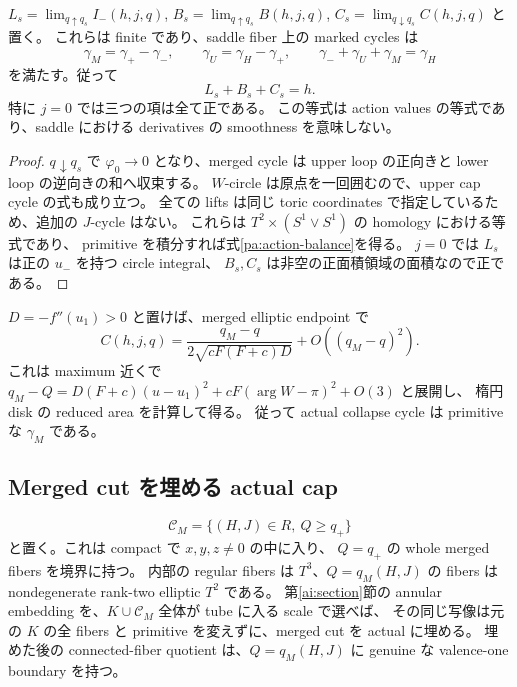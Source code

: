 \begin{proposition}\label{pa:saddle-balance}
$L_s=\lim_{q\uparrow q_s}I_-(h,j,q)$,
$B_s=\lim_{q\uparrow q_s}B(h,j,q)$,
$C_s=\lim_{q\downarrow q_s}C(h,j,q)$ と置く。
これらは finite であり、saddle fiber 上の marked cycles は
\begin{equation}\label{pa:cycle-balance}
 \gamma_M=\gamma_+-\gamma_-,\qquad
 \gamma_U=\gamma_H-\gamma_+,
 \qquad \gamma_-+\gamma_U+\gamma_M=\gamma_H
\end{equation}
を満たす。従って
\begin{equation}\label{pa:action-balance}
 L_s+B_s+C_s=h.
\end{equation}
特に $j=0$ では三つの項は全て正である。
この等式は action values の等式であり、saddle における derivatives の smoothness を意味しない。
\end{proposition}

\begin{proof}
$q\downarrow q_s$ で $\varphi_0\to0$ となり、merged cycle は
upper loop の正向きと lower loop の逆向きの和へ収束する。
$W$-circle は原点を一回囲むので、upper cap cycle の式も成り立つ。
全ての lifts は同じ toric coordinates で指定しているため、追加の $J$-cycle はない。
これらは $T^2\times(S^1\vee S^1)$ の homology における等式であり、
primitive を積分すれば式\eqref{pa:action-balance}を得る。
$j=0$ では $L_s$ は正の $u_-$ を持つ circle integral、
$B_s,C_s$ は非空の正面積領域の面積なので正である。
\end{proof}

$D=-f''(u_1)>0$ と置けば、merged elliptic endpoint で
\begin{equation}\label{pa:max-expansion}
 C(h,j,q)=\frac{q_M-q}{2\sqrt{cF(F+c)D}}+O((q_M-q)^2).
\end{equation}
これは maximum 近くで
$q_M-Q=D(F+c)(u-u_1)^2+cF(\arg W-\pi)^2+O(3)$ と展開し、
楕円 disk の reduced area を計算して得る。
従って actual collapse cycle は primitive な $\gamma_M$ である。

\subsection{Merged cut を埋める actual cap}

\begin{theorem}\label{pa:actual-merged-cap}
\[
 \mathcal C_M=\{(H,J)\in R,\ Q\ge q_+\}
\]
と置く。これは compact で $x,y,z\ne0$ の中に入り、
$Q=q_+$ の whole merged fibers を境界に持つ。
内部の regular fibers は $T^3$、$Q=q_M(H,J)$ の fibers は nondegenerate rank-two elliptic $T^2$ である。
第\ref{ai:section}節の annular embedding を、$K\cup\mathcal C_M$ 全体が tube に入る scale で選べば、
その同じ写像は元の $K$ の全 fibers と primitive を変えずに、merged cut を actual に埋める。
埋めた後の connected-fiber quotient は、$Q=q_M(H,J)$ に genuine な valence-one boundary を持つ。
\end{theorem}

